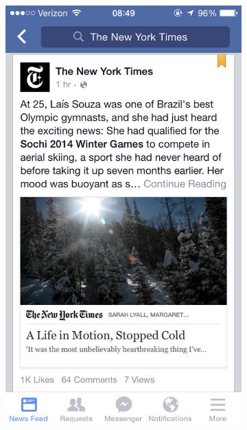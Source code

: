 \documentclass[graphic, aspectratio=169]{beamer}
\begin{document}
\begin{frame}
    \begin{figure}
    \centering
        \begin{subfigure}[b]{0.3\textwidth}
        \includegraphics[width=\textwidth]{images/FA_example.jpg}
        \label{fig:Facebook Instant Articles}
    \end{subfigure}
    ~ %

\end{figure}
\end{frame}
\end{document}
